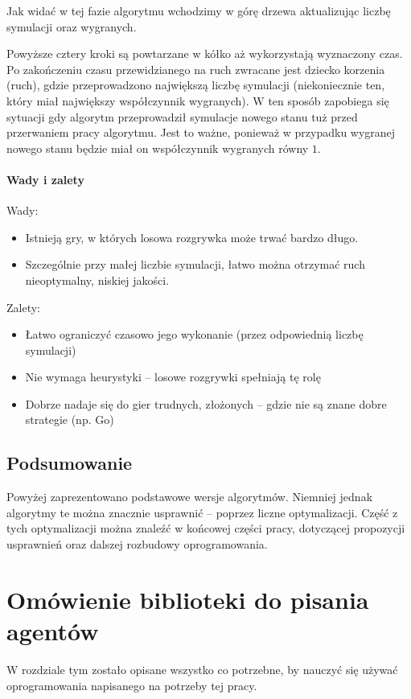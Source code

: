 \documentclass[polish,shortabstract,inz]{iithesis}
\begin{document}


Jak widać w tej fazie algorytmu wchodzimy w górę drzewa aktualizując liczbę symulacji oraz wygranych.

Powyższe cztery kroki są powtarzane w kółko aż wykorzystają wyznaczony czas.
Po zakończeniu czasu przewidzianego na ruch zwracane jest dziecko korzenia (ruch), gdzie przeprowadzono największą liczbę symulacji (niekoniecznie ten, który miał największy współczynnik wygranych).
W ten sposób zapobiega się sytuacji gdy algorytm przeprowadził symulacje nowego stanu tuż przed przerwaniem pracy algorytmu.
Jest to ważne, ponieważ w przypadku wygranej nowego stanu będzie miał on współczynnik wygranych równy \( 1 \).

\subsubsection{Wady i zalety}
Wady:
\begin{itemize}
  \item Istnieją gry, w których losowa rozgrywka może trwać bardzo długo.
  \item Szczególnie przy małej liczbie symulacji, łatwo można otrzymać ruch nieoptymalny, niskiej jakości.
\end{itemize}
Zalety:
\begin{itemize}
  \item Łatwo ograniczyć czasowo jego wykonanie (przez odpowiednią liczbę symulacji)
  \item Nie wymaga heurystyki -- losowe rozgrywki spełniają tę rolę
  \item Dobrze nadaje się do gier trudnych, złożonych -- gdzie nie są znane dobre strategie (np. Go)
\end{itemize}

\section{Podsumowanie}
Powyżej zaprezentowano podstawowe wersje algorytmów.
Niemniej jednak algorytmy te można znacznie usprawnić -- poprzez liczne optymalizacji.
Część z tych optymalizacji można znaleźć w końcowej części pracy, dotyczącej propozycji usprawnień oraz dalszej rozbudowy oprogramowania.


\chapter{Omówienie biblioteki do pisania agentów}
W rozdziale tym zostało opisane wszystko co potrzebne, by nauczyć się używać oprogramowania napisanego na potrzeby tej pracy.
\end{document}

